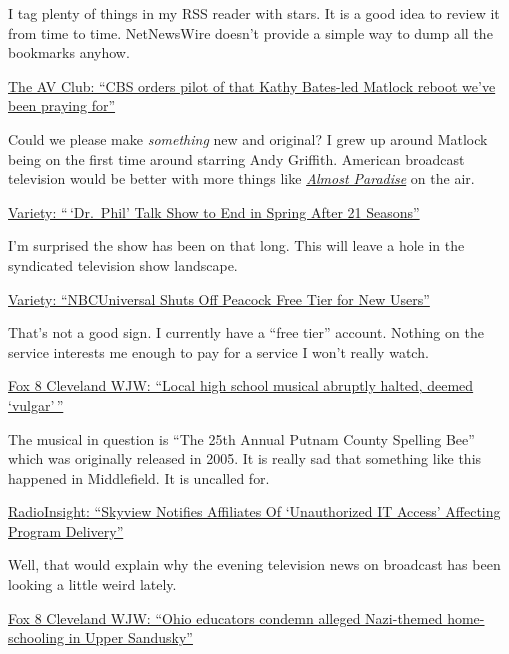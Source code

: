 I tag plenty of things in my RSS reader with stars. It is a good idea to
review it from time to time. NetNewsWire doesn't provide a simple way to
dump all the bookmarks anyhow.

\href{https://www.avclub.com/cbs-orders-pilot-of-matlock-reboot-starring-kathy-bates-1850057294}{The
AV Club: ``CBS orders pilot of that Kathy Bates-led Matlock reboot we've
been praying for''}

Could we please make \emph{something} new and original? I grew up around
Matlock being on the first time around starring Andy Griffith. American
broadcast television would be better with more things like
\href{https://en.wikipedia.org/w/index.php?title=Almost_Paradise_(TV_series)&oldid=1136391664}{\emph{Almost
Paradise}} on the air.

\href{https://variety.com/2023/tv/news/dr-phil-talk-show-end-oprah-cbs-1235508811/}{Variety:
``\,`Dr.~Phil' Talk Show to End in Spring After 21 Seasons''}

I'm surprised the show has been on that long. This will leave a hole in
the syndicated television show landscape.

\href{https://variety.com/2023/digital/news/peacock-ends-free-tier-nbcuniversal-1235508588/}{Variety:
``NBCUniversal Shuts Off Peacock Free Tier for New Users''}

That's not a good sign. I currently have a ``free tier'' account.
Nothing on the service interests me enough to pay for a service I won't
really watch.

\href{https://web.archive.org/web/20230201053754/https://fox8.com/news/local-high-school-musical-abruptly-halted-deemed-vulgar/}{Fox
8 Cleveland WJW: ``Local high school musical abruptly halted, deemed
`vulgar'\,''}

The musical in question is ``The 25th Annual Putnam County Spelling
Bee'' which was originally released in 2005. It is really sad that
something like this happened in Middlefield. It is uncalled for.

\href{https://web.archive.org/web/20230201054113/https://radioinsight.com/headlines/248153/skyview-notifies-affiliates-of-unauthorized-it-access-affecting-program-delivery/}{RadioInsight:
``Skyview Notifies Affiliates Of `Unauthorized IT Access' Affecting
Program Delivery''}

Well, that would explain why the evening television news on broadcast
has been looking a little weird lately.

\href{https://web.archive.org/web/20230201054252/https://fox8.com/news/i-team/ohio-educators-condemn-alleged-nazi-themed-home-schooling-in-upper-sandusky/}{Fox
8 Cleveland WJW: ``Ohio educators condemn alleged Nazi-themed
home-schooling in Upper Sandusky''}

